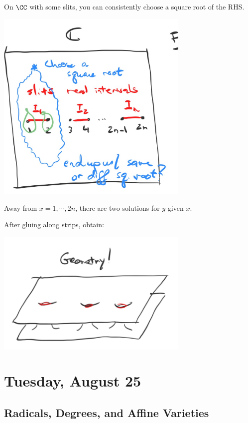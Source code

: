 \begin{fact}

On \(\CC\) with some slits, you can consistently choose a square root of
the RHS.

\includegraphics[width=3.64583in,height=\textheight]{figures/image_2020-08-21-01-31-47.png}

Away from \(x=1, \cdots, 2n\), there are two solutions for \(y\) given
\(x\).

After gluing along strips, obtain:

\includegraphics[width=3.64583in,height=\textheight]{figures/image_2020-08-21-01-32-48.png}

\end{fact}

\hypertarget{tuesday-august-25}{%
\section{Tuesday, August 25}\label{tuesday-august-25}}

\hypertarget{radicals-degrees-and-affine-varieties}{%
\subsection{Radicals, Degrees, and Affine
Varieties}\label{radicals-degrees-and-affine-varieties}}

